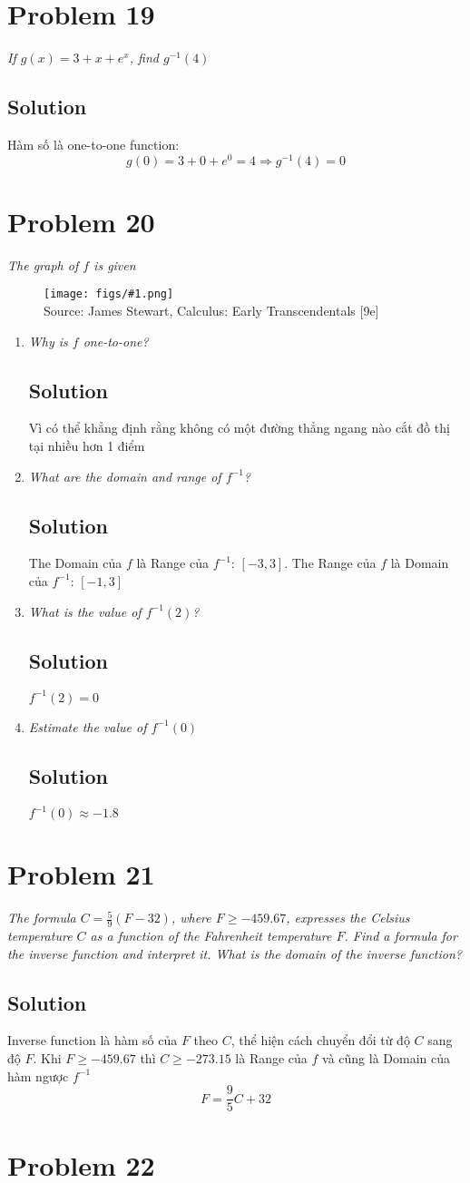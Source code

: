 \documentclass[11pt]{article}
\newcommand{\soln}{\subsection*}
\newcommand{\qn}{\textit}
\newcommand{\imagesource}[1]{{\footnotesize Source: #1}}
\newcommand{\imgqn}[1]{
	\begin{figure}[H]
		\centering
		\texttt{[image: figs/\#1.png]}\\
		\imagesource{James Stewart, Calculus: Early Transcendentals [9e]}
	\end{figure}
}
\begin{document}
\section*{Problem 19}

\qn{If $g(x)=3+x+e^x$, find $g^{-1}(4)$}

\soln{Solution}
Hàm số là one-to-one function: $$g(0)=3+0+e^0=4 \Rightarrow g^{-1}(4)=0$$

\section*{Problem 20}

\qn{The graph of $f$ is given}
\imgqn{1.5.20}
\begin{enumerate}
	\item \qn{Why is $f$ one-to-one?}
	\soln{Solution}
	Vì có thể khẳng định rằng không có một đường thẳng ngang nào cắt đồ thị tại nhiều hơn 1 điểm
	
	\item \qn{What are the domain and range of $f^{-1}$?}
	\soln{Solution}
	The Domain của $f$ là Range của $f^{-1}$: $[-3,3]$. The Range của $f$ là Domain của $f^{-1}$: $[-1, 3]$
	
	\item \qn{What is the value of $f^{-1}(2)$?}
	\soln{Solution}
	$f^{-1}(2)=0$
	
	\item \qn{Estimate the value of $f^{-1}(0)$}
	\soln{Solution}
	$f^{-1}(0) \approx -1.8$
\end{enumerate}

\section*{Problem 21}

\qn{The formula $C=\frac{5}{9}(F-32)$, where $F \ge -459.67$, expresses the Celsius temperature $C$ as a function of the Fahrenheit temperature $F$. Find a formula for the inverse function and interpret it. What is the domain of the inverse function?}

\soln{Solution}
Inverse function là hàm số của $F$ theo $C$, thể hiện cách chuyển đổi từ độ $C$ sang độ $F$. Khi $F \ge -459.67$ thì $C \ge -273.15$ là Range của $f$ và cũng là Domain của hàm ngược $f^{-1}$
$$F=\frac{9}{5}C+32$$

\section*{Problem 22}
\end{document}
